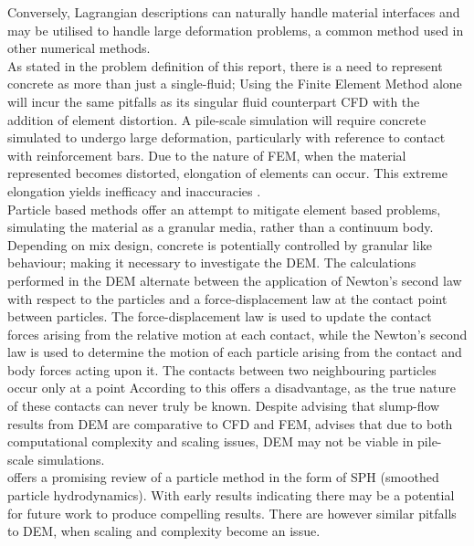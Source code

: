\newline
\noindent
Conversely, Lagrangian descriptions can naturally handle material interfaces and may be utilised to handle large deformation problems, a common method used in other numerical methods.\\ 
\newline
\noindent
As stated in the problem definition of this report, there is a need to represent concrete as more than just a single-fluid; Using the Finite Element Method alone will incur the same pitfalls as its singular fluid counterpart CFD \citep{sofcf} with the addition of element distortion. A pile-scale simulation will require concrete simulated to undergo large deformation, particularly with reference to contact with reinforcement bars. Due to the nature of FEM, when the material represented becomes distorted, elongation of elements can occur. This extreme elongation yields inefficacy and inaccuracies \citep{moresi03}. \\
\newline
\noindent
Particle based methods offer an attempt to mitigate element based problems, simulating the material as a granular media, rather than a continuum body. Depending on mix design, concrete is potentially controlled by granular like behaviour; making it necessary to investigate the DEM. The calculations performed in the DEM alternate between the application of Newton’s second law with respect to the particles and a force-displacement law at the contact point between particles. The force-displacement law is used to update the contact forces arising from the relative motion at each contact, while the Newton’s second law is used to determine the motion of each particle arising from the contact and body forces acting upon it. The contacts between two neighbouring particles occur only at a point \cite{TAN215} According to \cite{roussel07} this offers a disadvantage, as the true nature of these contacts can never truly be known. Despite \citet{roussel16} advising that slump-flow results from DEM are comparative to CFD and FEM, \citet{roussel06} advises that due to both computational complexity and scaling issues, DEM may not be viable in pile-scale simulations.\\
\newline
\noindent
\citet{ALYHYA17} offers a promising review of a particle method in the form of SPH (smoothed particle hydrodynamics). With early results indicating there may be a potential for future work to produce compelling results. There are however similar pitfalls to DEM, when scaling and complexity become an issue. \\
